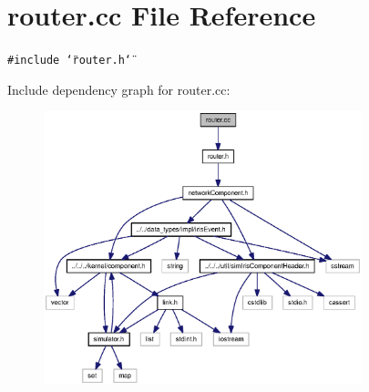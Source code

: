 \section{router.cc File Reference}
\label{router_8cc}
{\tt \#include \char`\"{}router.h\char`\"{}}\par


Include dependency graph for router.cc:\nopagebreak
\begin{figure}[H]
\begin{center}
\leavevmode
\includegraphics[width=262pt]{router_8cc__incl}
\end{center}
\end{figure}
